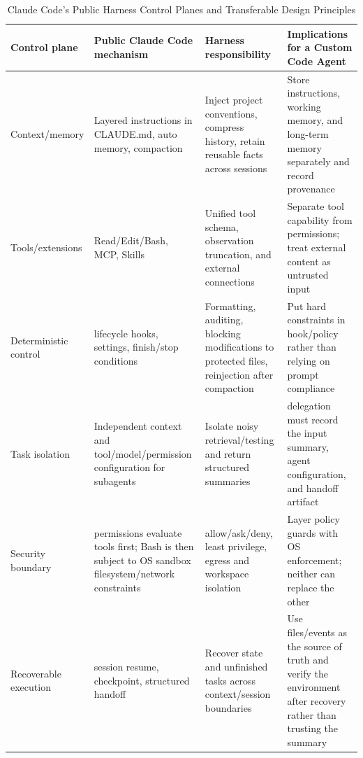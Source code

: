 \documentclass[10pt,a4paper,UTF8,fontset=none]{ctexart}
\newcommand{\ident}[1]{{\rmfamily #1}}
\begin{document}
\begin{table}[htbp]
\centering
\caption{Claude Code's Public Harness Control Planes and Transferable Design Principles}
\label{en:tab:claude-code-public-architecture}
\small
\begin{tabularx}{\textwidth}{p{2.4cm}p{4.2cm}Y Y}
\toprule
Control plane & Public Claude Code mechanism & Harness responsibility & Implications for a Custom Code Agent \\
\midrule
Context/memory & Layered instructions in \ident{CLAUDE.md}, auto memory, compaction & Inject project conventions, compress history, retain reusable facts across sessions & Store instructions, working memory, and long-term memory separately and record provenance\cite{en:claudecodememory2026} \\
Tools/extensions & Read/Edit/Bash, MCP, Skills & Unified tool schema, observation truncation, and external connections & Separate tool capability from permissions; treat external content as untrusted input \\
Deterministic control & lifecycle hooks, settings, finish/stop conditions & Formatting, auditing, blocking modifications to protected files, reinjection after compaction & Put hard constraints in hook/policy rather than relying on prompt compliance\cite{en:claudecodehooks2026} \\
Task isolation & Independent context and tool/model/permission configuration for subagents & Isolate noisy retrieval/testing and return structured summaries & delegation must record the input summary, agent configuration, and handoff artifact\cite{en:claudecodesubagents2026} \\
Security boundary & permissions evaluate tools first; Bash is then subject to OS sandbox filesystem/network constraints & allow/ask/deny, least privilege, egress and workspace isolation & Layer policy guards with OS enforcement; neither can replace the other\cite{en:claudecodesandbox2026} \\
Recoverable execution & session resume, checkpoint, structured handoff & Recover state and unfinished tasks across context/session boundaries & Use files/events as the source of truth and verify the environment after recovery rather than trusting the summary \\
\bottomrule
\end{tabularx}
\end{table}
\end{document}
